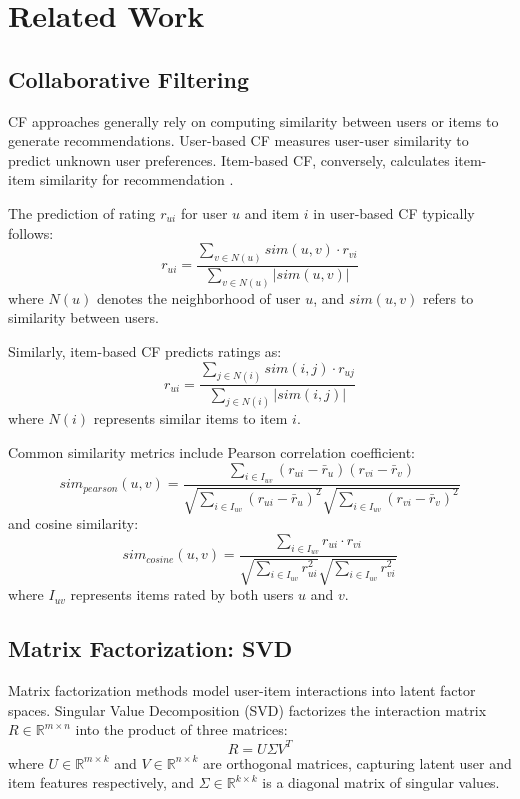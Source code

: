 \documentclass[sigconf,nonacm]{acmart} %
\begin{document}
\section{Related Work}
\subsection{Collaborative Filtering}
CF approaches generally rely on computing similarity between users or items to generate recommendations. User-based CF measures user-user similarity to predict unknown user preferences. Item-based CF, conversely, calculates item-item similarity for recommendation \cite{sarwar2001item}.

The prediction of rating $r_{ui}$ for user $u$ and item $i$ in user-based CF typically follows:
\begin{equation}
r_{ui} = \frac{\sum_{v \in N(u)} sim(u,v) \cdot r_{vi}}{\sum_{v \in N(u)}|sim(u,v)|}
\label{eq:userbased}
\end{equation}
where $N(u)$ denotes the neighborhood of user $u$, and $sim(u,v)$ refers to similarity between users.

Similarly, item-based CF predicts ratings as:
\begin{equation}
r_{ui} = \frac{\sum_{j \in N(i)} sim(i,j) \cdot r_{uj}}{\sum_{j \in N(i)}|sim(i,j)|}
\label{eq:itembased}
\end{equation}
where $N(i)$ represents similar items to item $i$.

Common similarity metrics include Pearson correlation coefficient:
\begin{equation}
sim_{pearson}(u,v) = \frac{\sum_{i \in I_{uv}}(r_{ui} - \bar{r}_u)(r_{vi} - \bar{r}_v)}{\sqrt{\sum_{i \in I_{uv}}(r_{ui} - \bar{r}_u)^2}\sqrt{\sum_{i \in I_{uv}}(r_{vi} - \bar{r}_v)^2}}
\label{eq:pearson}
\end{equation}
and cosine similarity:
\begin{equation}
sim_{cosine}(u,v) = \frac{\sum_{i \in I_{uv}}r_{ui} \cdot r_{vi}}{\sqrt{\sum_{i \in I_{uv}}r_{ui}^2}\sqrt{\sum_{i \in I_{uv}}r_{vi}^2}}
\label{eq:cosine}
\end{equation}
where $I_{uv}$ represents items rated by both users $u$ and $v$.

\subsection{Matrix Factorization: SVD}
Matrix factorization methods model user-item interactions into latent factor spaces. Singular Value Decomposition (SVD) factorizes the interaction matrix $R \in \mathbb{R}^{m \times n}$ into the product of three matrices:
\begin{equation}
R = U \Sigma V^T
\label{eq:svd}
\end{equation}
where $U \in \mathbb{R}^{m \times k}$ and $V \in \mathbb{R}^{n \times k}$ are orthogonal matrices, capturing latent user and item features respectively, and $\Sigma \in \mathbb{R}^{k \times k}$ is a diagonal matrix of singular values.
\end{document}
